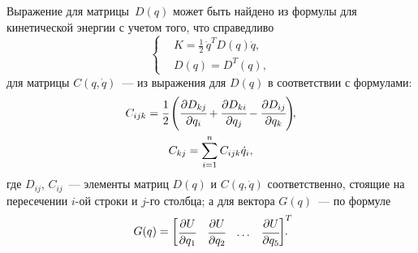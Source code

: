 Выражение для матрицы~$D(q)$ может быть найдено из формулы для кинетической энергии с учетом того, что справедливо
\begin{equation}\label{eq_K_in_form_with_D}
    \left\{
    \begin{aligned}
        \!& K = \frac{1}{2} \, \dot{q}^T D(q) \dot{q}, \\
        \!& D(q) = D^T\!(q),
    \end{aligned}
    \right.
\end{equation}
для матрицы $C(q,\dot{q})$~--- из выражения для $D(q)$ в соответствии с формулами:
\begin{gather}
    C_{ijk} = \cfrac{1}{2} \left( \cfrac{\partial D_{kj}}{\partial q_i} + \cfrac{\partial D_{ki}}{\partial q_j} - \cfrac{\partial D_{ij}}{\partial q_k}\right)\!\!,
    \\
    C_{kj} = \sum_{i = 1}^n C_{ijk} \dot{q}_i,
\end{gather}
где $D_{ij}$, $C_{ij}$~--- элементы матриц $D(q)$ и $C(q,\dot{q})$ соответственно, стоящие на пересечении $i$-ой строки и $j$-го столбца;
а для вектора $G(q)$~--- по формуле
\begin{equation}
    G(q) =
    \begin{bmatrix}
        \cfrac{\partial U}{\partial q_1} &
        \cfrac{\partial U}{\partial q_2} &
        \dots &
        \cfrac{\partial U}{\partial q_5}
    \end{bmatrix}^T\!\!\!\!\!\ldotp
\end{equation}

